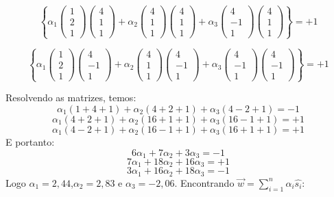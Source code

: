 \documentclass[
  openany]{book}
\begin{document}
\[\left\{
\alpha_1
\begin{pmatrix}
1\\2\\1
\end{pmatrix}
\begin{pmatrix}
4\\1\\1
\end{pmatrix} +
\alpha_2
\begin{pmatrix}
4\\1\\1
\end{pmatrix}
\begin{pmatrix}
4\\1\\1
\end{pmatrix}+
\alpha_3
\begin{pmatrix}
4\\-1\\1
\end{pmatrix}
\begin{pmatrix}
4\\1\\1
\end{pmatrix}
\right\}=+1\]

\[\left\{
\alpha_1
\begin{pmatrix}
1\\2\\1
\end{pmatrix}
\begin{pmatrix}
4\\-1\\1
\end{pmatrix} +
\alpha_2
\begin{pmatrix}
4\\1\\1
\end{pmatrix}
\begin{pmatrix}
4\\-1\\1
\end{pmatrix}+
\alpha_3
\begin{pmatrix}
4\\-1\\1
\end{pmatrix}
\begin{pmatrix}
4\\-1\\1
\end{pmatrix}
\right\}=+1\]

Resolvendo as matrizes, temos:
\[\alpha_1(1+4+1)+\alpha_2(4+2+1)+\alpha_3(4-2+1)=-1\]
\[\alpha_1(4+2+1)+\alpha_2(16+1+1)+\alpha_3(16-1+1)=+1\]
\[\alpha_1(4-2+1)+\alpha_2(16-1+1)+\alpha_3(16+1+1)=+1\]
E portanto:
\[6\alpha_1+7\alpha_2+3\alpha_3=-1\]
\[7\alpha_1+18\alpha_2+16\alpha_3=+1\]
\[3\alpha_1+16\alpha_2+18\alpha_3=-1\]
Logo \(\alpha_1=2,44\),\(\alpha_2=2,83\) e \(\alpha_3=-2,06\). Encontrando \(\vec{w}=\displaystyle \sum^n_{i=1}\alpha_i \hat{s_i}\):
\end{document}
